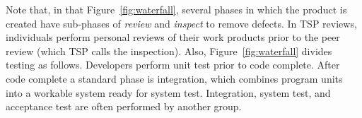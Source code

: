  


Note that, in that Figure~\ref{fig:waterfall},
several  phases in which the product is created have sub-phases of {\em review} and {\em inspect} to remove defects.
In TSP  reviews,  individuals perform personal reviews of their work products prior to the peer review
(which TSP calls the inspection).
Also, Figure~\ref{fig:waterfall} divides  testing     as follows. Developers perform unit test prior to code complete.  After code complete a standard phase is integration, which combines program units into a workable system ready for system test. Integration,  system test, and acceptance test are often performed by another group. 

